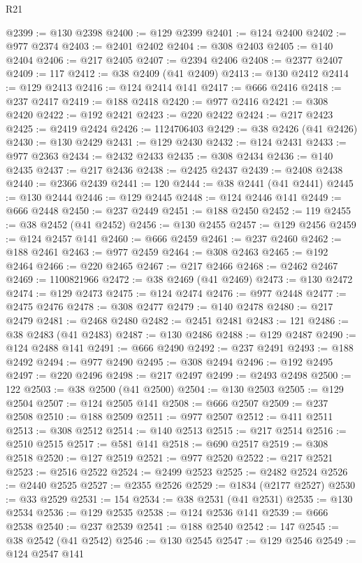 \begin{lexlean}{R21}
\begin{coremodule}
@2399 := @130 @2398
@2400 := @129 @2399
@2401 := @124 @2400
@2402 := @977 @2374
@2403 := @2401 @2402
@2404 := @308 @2403
@2405 := @140 @2404
@2406 := @217 @2405
@2407 := @2394 @2406
@2408 := @2377 @2407
@2409 := 117
@2412 := @38 @2409 (@41 @2409)
@2413 := @130 @2412
@2414 := @129 @2413
@2416 := @124 @2414 @141
@2417 := @666 @2416
@2418 := @237 @2417
@2419 := @188 @2418
@2420 := @977 @2416
@2421 := @308 @2420
@2422 := @192 @2421
@2423 := @220 @2422
@2424 := @217 @2423
@2425 := @2419 @2424
@2426 := 1124706403
@2429 := @38 @2426 (@41 @2426)
@2430 := @130 @2429
@2431 := @129 @2430
@2432 := @124 @2431
@2433 := @977 @2363
@2434 := @2432 @2433
@2435 := @308 @2434
@2436 := @140 @2435
@2437 := @217 @2436
@2438 := @2425 @2437
@2439 := @2408 @2438
@2440 := @2366 @2439
@2441 := 120
@2444 := @38 @2441 (@41 @2441)
@2445 := @130 @2444
@2446 := @129 @2445
@2448 := @124 @2446 @141
@2449 := @666 @2448
@2450 := @237 @2449
@2451 := @188 @2450
@2452 := 119
@2455 := @38 @2452 (@41 @2452)
@2456 := @130 @2455
@2457 := @129 @2456
@2459 := @124 @2457 @141
@2460 := @666 @2459
@2461 := @237 @2460
@2462 := @188 @2461
@2463 := @977 @2459
@2464 := @308 @2463
@2465 := @192 @2464
@2466 := @220 @2465
@2467 := @217 @2466
@2468 := @2462 @2467
@2469 := 1100821966
@2472 := @38 @2469 (@41 @2469)
@2473 := @130 @2472
@2474 := @129 @2473
@2475 := @124 @2474
@2476 := @977 @2448
@2477 := @2475 @2476
@2478 := @308 @2477
@2479 := @140 @2478
@2480 := @217 @2479
@2481 := @2468 @2480
@2482 := @2451 @2481
@2483 := 121
@2486 := @38 @2483 (@41 @2483)
@2487 := @130 @2486
@2488 := @129 @2487
@2490 := @124 @2488 @141
@2491 := @666 @2490
@2492 := @237 @2491
@2493 := @188 @2492
@2494 := @977 @2490
@2495 := @308 @2494
@2496 := @192 @2495
@2497 := @220 @2496
@2498 := @217 @2497
@2499 := @2493 @2498
@2500 := 122
@2503 := @38 @2500 (@41 @2500)
@2504 := @130 @2503
@2505 := @129 @2504
@2507 := @124 @2505 @141
@2508 := @666 @2507
@2509 := @237 @2508
@2510 := @188 @2509
@2511 := @977 @2507
@2512 := @411 @2511
@2513 := @308 @2512
@2514 := @140 @2513
@2515 := @217 @2514
@2516 := @2510 @2515
@2517 := @581 @141
@2518 := @690 @2517
@2519 := @308 @2518
@2520 := @127 @2519
@2521 := @977 @2520
@2522 := @217 @2521
@2523 := @2516 @2522
@2524 := @2499 @2523
@2525 := @2482 @2524
@2526 := @2440 @2525
@2527 := @2355 @2526
@2529 := @1834 (@2177 @2527)
@2530 := @33 @2529
@2531 := 154
@2534 := @38 @2531 (@41 @2531)
@2535 := @130 @2534
@2536 := @129 @2535
@2538 := @124 @2536 @141
@2539 := @666 @2538
@2540 := @237 @2539
@2541 := @188 @2540
@2542 := 147
@2545 := @38 @2542 (@41 @2542)
@2546 := @130 @2545
@2547 := @129 @2546
@2549 := @124 @2547 @141

\end{coremodule}
\end{lexlean}
